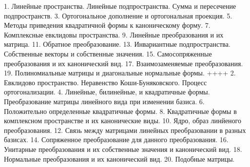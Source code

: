 1. Линейные пространства. Линейные подпространства. Сумма и пересечение подпространств.
3. Ортогональное дополнение и ортогональная проекция.
5. Методы приведения квадратичной формы к каноническому форму.
7. Комплексные евклидовы пространства.
9. Линейные преобразования и их матрица.
11. Обратное преобразование.
13. Инвариантные подпространства. Собственные векторы и собственные значения.
15. Самосопряженные преобразования и их канонический вид.
17. Взаимозаменяемые преобразования.
19. Полиномиальные матрицы и диагональные нормальные формы.
++++
2. Евклидово пространство. Неравенство Коши-Буняковского. Процесс ортогонализации.
4. Линейные, билинейные, и квадратичные формы. Преобразование матрицы линейного вида при изменении базиса.
6. Положительно определенные квадратичные формы.
8. Квадратичные формы в комплексном пространстве и их канонические виды.
10. Ядро, образ линйеного преобразования.
12. Связь между матрицами линейных преобразовании в разных базисах.
14. Сопряженное преобразование для данного преобразования.
16. Унитарные преобразования и их собственные значения и канонический вид.
18. Нормальные преобразования и их канонический вид.
20. Подобные матрицы.
